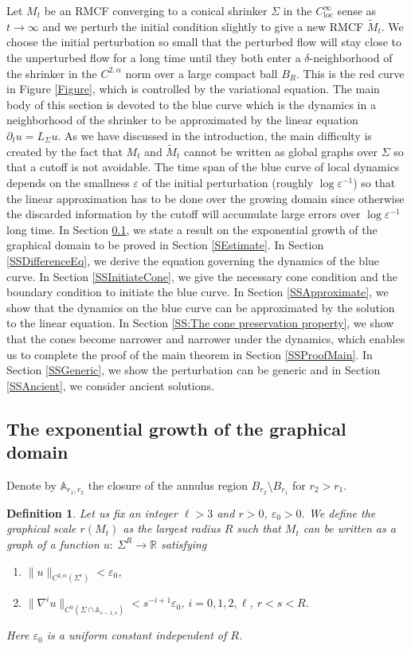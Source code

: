 \documentclass[12pt]{amsart}
\numberwithin{equation}{section}
\newtheorem{definition}[theorem]{Definition}
\numberwithin{equation}{section}
\newcommand{\eps}{\varepsilon}
\newcommand{\dt}{\delta}
\newcommand{\al}{\alpha}
\newcommand{\R}{\mathbb{R}}
\DeclareMathOperator{\loc}{loc}
\begin{document}
	Let $M_t$ be an RMCF converging to a conical shrinker $\Sigma$ in the $C^\infty_{\loc}$ sense as $t\to\infty$ and we perturb the initial condition slightly to give a new RMCF $\widetilde M_t$. We choose the initial perturbation so small that the perturbed flow will stay close to the unperturbed flow for a long time until they both enter a $\dt$-neighborhood of the shrinker in the $C^{2,\al}$ norm over a large compact ball $B_R$. This is the red curve in Figure \ref{Figure}, which is controlled by the variational equation. The main body of this section is devoted to the blue curve which is the dynamics in a neighborhood of the shrinker to be approximated by the linear equation $\partial_t u=L_\Sigma u$. As we have discussed in the introduction, the main difficulty is created by the fact that $M_t$ and $\widetilde M_t$ cannot be written as global graphs over $\Sigma$ so that a cutoff is not avoidable. The time span of the blue curve of local dynamics depends on the smallness $\eps$ of the initial perturbation (roughly $\log\eps^{-1}$) so that the linear approximation has to be done over the growing domain since otherwise the discarded information by the cutoff will accumulate large errors over  $\log\eps^{-1}$ long time. In Section \ref{SSDomain}, we state a result on the exponential growth of the graphical domain to be proved in Section \ref{SEstimate}. In Section \ref{SSDifferenceEq}, we derive the equation governing the dynamics of the blue curve. In Section \ref{SSInitiateCone}, we give the necessary cone condition and the boundary condition to initiate the blue curve. In Section \ref{SSApproximate}, we show that the dynamics on the blue curve can be approximated by the solution to the linear equation. In Section \ref{SS:The cone preservation property}, we show that the cones become narrower and narrower under the dynamics, which enables us to complete the proof of the main theorem in Section \ref{SSProofMain}. In Section \ref{SSGeneric}, we show the perturbation can be generic and in Section \ref{SSAncient}, we consider ancient solutions. 
	
	
	\subsection{The exponential growth of the graphical domain}\label{SSDomain}
	
	Denote by $\mathbb A_{r_1,r_2}$ the closure of the annulus region $B_{r_2}\setminus B_{r_1}$ for $r_2>r_1.$
	\begin{definition}\label{DefGraphical}
		Let us fix an integer $\ell>3$ and $r>0$, $\eps_0>0$. We define \emph{the graphical scale $\mathit r(M_t)$} as the largest radius $R$ such that $  M_t$ can be written as a graph of a function $u:\ \Sigma^R\to \R$ satisfying
		\begin{enumerate}
			\item $\|u\|_{C^{2,\alpha}(\Sigma^r)}<\eps_0$,
			\item $\|\nabla^i u\|_{C^{0}(\Sigma\cap \mathbb A_{s-1,s})}< s^{-i+1}\eps_0$, $i=0,1,2,\ell$, $r<s<R$.
		\end{enumerate}
		Here $\eps_0$ is a uniform constant independent of $R$. 
		
		
	\end{definition}
	
\end{document}
